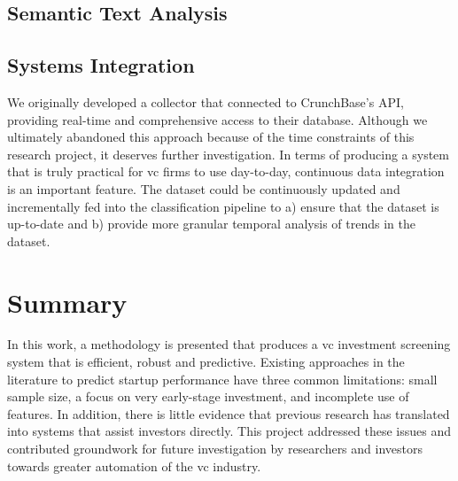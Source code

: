 \documentclass[../thesis/thesis.tex]{subfiles}
\begin{document}
\subsection{Semantic Text Analysis}


\subsection{Systems Integration}

We originally developed a collector that connected to CrunchBase’s API, providing real-time and comprehensive access to their database. Although we ultimately abandoned this approach because of the time constraints of this research project, it deserves further investigation. In terms of producing a system that is truly practical for \gls{vc} firms to use day-to-day, continuous data integration is an important feature.  The dataset could be continuously updated and incrementally fed into the classification pipeline to a) ensure that the dataset is up-to-date and b) provide more granular temporal analysis of trends in the dataset.

\section{Summary}

In this work, a methodology is presented that produces a \gls{vc} investment screening system that is efficient, robust and predictive. Existing approaches in the literature to predict startup performance have three common limitations: small sample size, a focus on very early-stage investment, and incomplete use of features. In addition, there is little evidence that previous research has translated into systems that assist investors directly. This project addressed these issues and contributed groundwork for future investigation by researchers and investors towards greater automation of the \gls{vc} industry.

\end{document}

